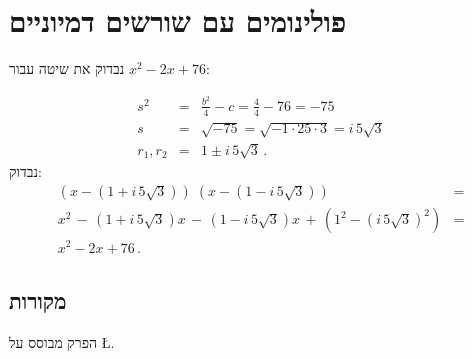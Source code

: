 

\section{פולינומים עם שורשים דמיוניים}\label{s.irreducible}

נבדוק את שיטה עבור
$x^2-2x+76$:

\begin{eqnarray*}
s^2&=&\frac{b^2}{4}-c=\frac{4}{4}-76=-75\\
s&=&\sqrt{-75}=\sqrt{-1\cdot 25\cdot 3}=i\,5\sqrt{3}\\
r_1,r_2&=&1\pm i\,5\sqrt{3}\,.
\end{eqnarray*}
נבדוק:
\[
\renewcommand*{\arraystretch}{1}
\begin{array}{ll}
(x-(1+i\,5\sqrt{3}))\;(x-(1-i\,5\sqrt{3}))&=\\
x^2 \,-\, (1+i\,5\sqrt{3})x\,-\,(1-i\,5\sqrt{3})x\,+\,(1^2-(i\,5\sqrt{3})^2)&=\\
x^2-2x+76\,.
\end{array}
\]




\subsection*{מקורות}

הפרק מבוסס על
\L{\cite{loh1,loh2}}.


